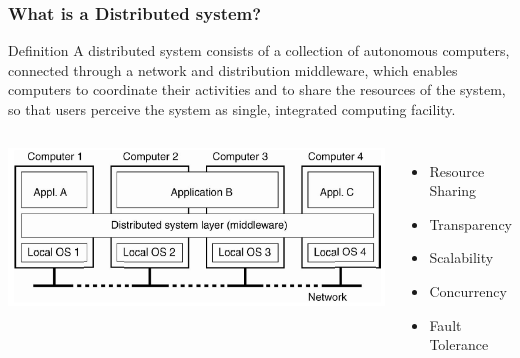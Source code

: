 \begin{frame}
    \frametitle{What is a Distributed system?}
    \begin{block}{Definition}
    A distributed system consists of a \alert{collection of autonomous computers}, connected through a \alert{network} and distribution \alert{middleware}, which enables computers to coordinate their activities and to share the resources of the system, so that users perceive the system as single, integrated computing facility.
    \end{block}
    \begin{columns}
            \includegraphics[scale=0.4]{figures/dist-arch.png}
            \begin{itemize}
                \item Resource Sharing
                \item Transparency
                \item Scalability
                \item Concurrency
                \item Fault Tolerance
            \end{itemize}
        \end{columns}
\end{frame}


